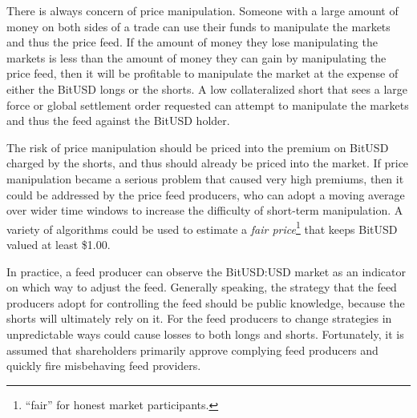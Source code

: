 There is always concern of price manipulation. Someone with a large amount of
money on both sides of a trade can use their funds to manipulate the markets
and thus the price feed. If the amount of money they lose manipulating the
markets is less than the amount of money they can gain by manipulating the
price feed, then it will be profitable to manipulate the market at the expense
of either the BitUSD longs or the shorts. A low collateralized short that sees
a large force or global settlement order requested can attempt to manipulate
the markets and thus the feed against the BitUSD holder.

The risk of price manipulation should be priced into the premium on BitUSD
charged by the shorts, and thus should already be priced into the market. If
price manipulation became a serious problem that caused very high premiums,
then it could be addressed by the price feed producers, who can adopt a moving
average over wider time windows to increase the difficulty of short-term
manipulation. A variety of algorithms could be used to estimate a \emph{fair
price}\footnote{``fair'' for honest market participants.} that keeps BitUSD
valued at least \$1.00.

In practice, a feed producer can observe the BitUSD:USD market as an indicator
on which way to adjust the feed. Generally speaking, the strategy that the feed
producers adopt for controlling the feed should be public knowledge, because
the shorts will ultimately rely on it. For the feed producers to change
strategies in unpredictable ways could cause losses to both longs and shorts.
Fortunately, it is assumed that shareholders primarily approve complying feed
producers and quickly fire misbehaving feed providers.
